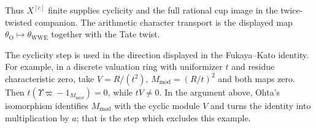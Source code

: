 Thus $X^{[e]}$ finite supplies cyclicity and the full rational
cup image in the twice-twisted companion.  The arithmetic character
transport is the displayed map $\theta_{\mathrm O}\mapsto
\theta_{\mathrm{WWE}}$ together with the Tate twist.

The cyclicity step is used in the direction displayed in the
Fukaya--Kato identity. For example, in a discrete valuation ring
with uniformizer $t$ and residue characteristic zero, take
$V=R/(t^2)$, $M_{\mathrm{mod}}=(R/t)^2$ and both maps zero. Then
$t(\Upsilon\varpi-1_{M_{\mathrm{mod}}})=0$, while $tV\ne0$.
In the argument above, Ohta's isomorphism identifies $M_{\mathrm{mod}}$ with the
cyclic module $V$ and turns the identity into multiplication by
$a$; that is the step which excludes this example.
